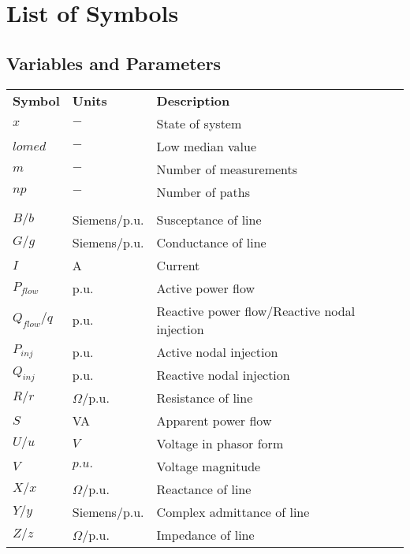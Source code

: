 \chapter*{List of Symbols}

\thispagestyle{plain}
\newcommand{\ThreeFirstCol}{40pt}
\newcommand{\ThreeSecondCol}{60pt}
\newcommand{\ThreeThirdCol}{240pt}

\newcommand{\TwoFirstCol}{112pt}
\newcommand{\TwoSecondCol}{240pt}


\section*{Variables and Parameters}
\begin{longtable}[l]{p{\ThreeFirstCol} p{\ThreeSecondCol} p{\ThreeThirdCol}} 
\textbf{Symbol}	& \textbf{Units} & \textbf{Description}
\smallskip \\
  $x$  & $-$			& State of system\\
  $lomed$ & $-$			& Low median value\\
  $m$	& $-$			& Number of measurements\\
  $np$  & $-$			& Number of paths\\

\bigskip
 \\
 $B/b$  		& Siemens/p.u. 	& Susceptance of line\\
 $G/g$  		& Siemens/p.u. 	& Conductance of line\\
 $I$ 		& A 					& Current\\
 $P_{flow}$		& p.u. 	& Active power flow\\
 $Q_{flow}/q$		& p.u.	& Reactive power flow/Reactive nodal injection\\
 $P_{inj}$		& p.u. 	& Active nodal injection\\
 $Q_{inj}$		& p.u. 	& Reactive nodal injection\\  
 $R/r$  		& $\Omega$/p.u. 	& Resistance of line\\
 $S$		& VA 	& Apparent power flow\\ 
 $U/u$  		& $V$	& Voltage in phasor form\\
 $V$  		& $p.u.$	& Voltage magnitude\\
 $X/x$  		& $\Omega$/p.u. 	& Reactance of line\\
 $Y/y$  		& Siemens/p.u. 	& Complex admittance of line\\
 $Z/z$  		& $\Omega$/p.u. 	& Impedance of line\\


\end{longtable}
